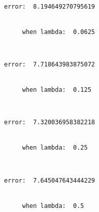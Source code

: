 \documentclass[11pt]{article}
\begin{document}
    \begin{Verbatim}[commandchars=\\\{\}]
     error:  8.194649270795619


     when lambda:  0.0625

    \end{Verbatim}

    \begin{center}
    \end{center}
    { \hspace*{\fill} \\}
    
    \begin{Verbatim}[commandchars=\\\{\}]
     error:  7.718643983875072


     when lambda:  0.125

    \end{Verbatim}

    \begin{center}
    \end{center}
    { \hspace*{\fill} \\}
    
    \begin{Verbatim}[commandchars=\\\{\}]
     error:  7.320036958382218


     when lambda:  0.25

    \end{Verbatim}

    \begin{center}
    \end{center}
    { \hspace*{\fill} \\}
    
    \begin{Verbatim}[commandchars=\\\{\}]
     error:  7.645047643444229


     when lambda:  0.5

    \end{Verbatim}

    \begin{center}
    \end{center}
    { \hspace*{\fill} \\}
    
\end{document}
